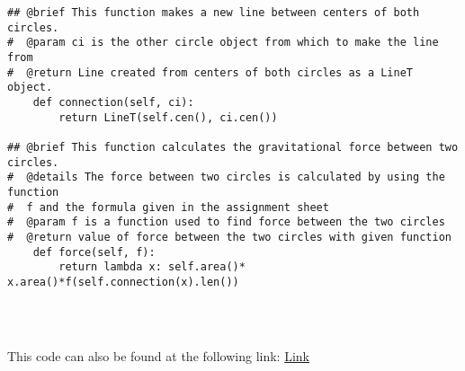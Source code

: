 \documentclass[12pt]{article}
\begin{document}
\begin{lstlisting}
## @brief This function makes a new line between centers of both circles.
#  @param ci is the other circle object from which to make the line from
#  @return Line created from centers of both circles as a LineT object.
    def connection(self, ci):
        return LineT(self.cen(), ci.cen())

## @brief This function calculates the gravitational force between two circles.
#  @details The force between two circles is calculated by using the function
#  f and the formula given in the assignment sheet
#  @param f is a function used to find force between the two circles
#  @return value of force between the two circles with given function
    def force(self, f):
        return lambda x: self.area()* x.area()*f(self.connection(x).len())
        
\end{lstlisting}

~\newline

\noindent This code can also be found at the following link:
\href{https://gitlab.cas.mcmaster.ca/se2aa4_cs2me3_assignments/patelm16/blob/master/A2/src/circleADT.py}{Link}

\newpage
\end{document}
